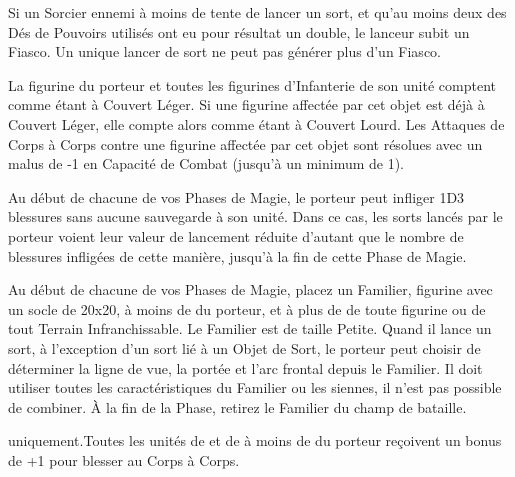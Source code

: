 Si un Sorcier ennemi à moins de  tente de lancer un sort, et qu'au moins deux des Dés de Pouvoirs utilisés ont eu pour résultat un double, le lanceur subit un Fiasco. Un unique lancer de sort ne peut pas générer plus d'un Fiasco.

\endpricelist

\armyenchanteditems

\startpricelist

 La figurine du porteur et toutes les figurines d'Infanterie de son unité comptent comme étant à Couvert Léger. Si une figurine affectée par cet objet est déjà à Couvert Léger, elle compte alors comme étant à Couvert Lourd. Les Attaques de Corps à Corps contre une figurine affectée par cet objet sont résolues avec un malus de -1 en Capacité de Combat (jusqu'à un minimum de 1).

\endpricelist

\armyarcaneitems

\startpricelist

Au début de chacune de vos Phases de Magie, le porteur peut infliger 1D3 blessures sans aucune sauvegarde à son unité. Dans ce cas, les sorts lancés par le porteur voient leur valeur de lancement réduite d'autant que le nombre de blessures infligées de cette manière, jusqu'à la fin de cette Phase de Magie.

Au début de chacune de vos Phases de Magie, placez un Familier, figurine avec un socle de \unit{20x20}{\milli\meter}, à moins de  du porteur, et à plus de  de toute figurine ou de tout Terrain Infranchissable. Le Familier est de taille Petite. Quand il lance un sort, à l'exception d'un sort lié à un Objet de Sort, le porteur peut choisir de déterminer la ligne de vue, la portée et l'arc frontal depuis le Familier. Il doit utiliser toutes les caractéristiques du Familier ou les siennes, il n'est pas possible de combiner. À la fin de la Phase, retirez le Familier du champ de bataille.

\endpricelist

\armymagicalbanners

\startpricelist

\fleetcommander{} uniquement.\newline Toutes les unités de \corsairs{} et de \dreadlegionnaires{} à moins de  du porteur reçoivent un bonus de +1 pour blesser au Corps à Corps.


